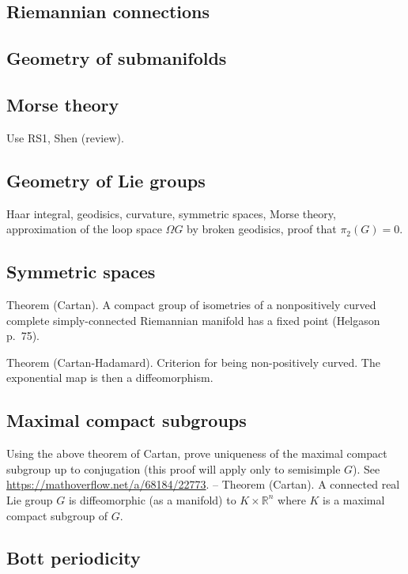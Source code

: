 \subsection{Riemannian connections}



\subsection{Geometry of submanifolds}



\subsection{Morse theory}

Use RS1, Shen (review). 


\subsection{Geometry of Lie groups}
Haar integral, geodisics, curvature, symmetric spaces, Morse theory, approximation of the loop space $\Omega G$ by broken geodisics, proof that $\pi_2(G)=0$.


\subsection{Symmetric spaces}

Theorem (Cartan). A compact group of isometries of a nonpositively curved complete simply-connected Riemannian manifold has a fixed point (Helgason p.~75).

Theorem (Cartan-Hadamard). Criterion for being non-positively curved. The exponential map is then a diffeomorphism.


\subsection{Maximal compact subgroups}

Using the above theorem of Cartan, prove uniqueness of the maximal compact subgroup up to conjugation (this proof will apply only to semisimple $G$). See \url{https://mathoverflow.net/a/68184/22773}.
--
Theorem (Cartan). A connected real Lie group $G$ is diffeomorphic (as a manifold) to $K\times\mathbb{R}^n$ where $K$ is a maximal compact subgroup of $G$.






\subsection{Bott periodicity}





